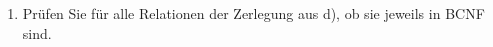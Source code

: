 \documentclass{lehramt-informatik-aufgabe}
\begin{document}
\begin{enumerate}
\begin{liAntwort}
\begin{itemize}
\r[R1]{\u{A, D}, E}\\
\r[R2]{\u{B, C}, A, E}\\
\r[R3]{\u{D}, B}\\
\r[R4]{\u{D, E}, C}\\
\r[R5]{\u{A}, F}

\item {}

\liNichtsZuTun

\item {}
\liNichtsZuTun

\end{itemize}
\end{liAntwort}


\item Prüfen Sie für alle Relationen der Zerlegung aus d), ob sie
jeweils in BCNF sind.

\begin{liAntwort}

\end{liAntwort}

\end{enumerate}
\end{document}
